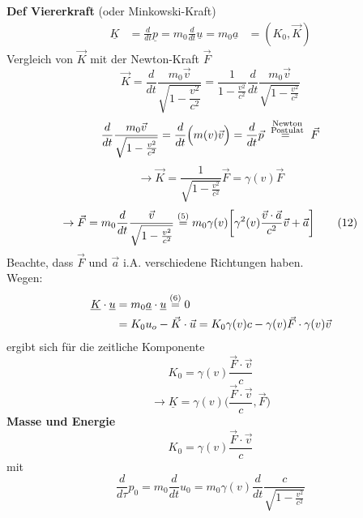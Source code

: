 \documentclass[titlepage,12pt,a4paper,ngerman]{report}
\newcommand{\tx}[1]{\textrm{#1}}
\begin{document}
\noindent
\textbf{Def Viererkraft} (oder Minkowski-Kraft)
\begin{align*}
\underline{K} &= \frac{d}{dt} \underline{p} = m_0 \frac{d}{dt} \underline{u} = m_0 \underline{a} \tag{10}
&= (K_0,\vec{K})
\end{align*}
Vergleich von $ \vec{K} $ mit der Newton-Kraft $ \vec{F} $
\begin{equation*}
\vec{K} = \frac{d}{dt} \frac{m_0 \vec{v}}{\sqrt{1-\dfrac{v^2}{c^2}}} = \frac{1}{1-\frac{v^2}{c^2}} \frac{d}{dt} \frac{m_0 \vec{v}}{\sqrt{1-\frac{v^2}{c^2}}}
\end{equation*}
\begin{equation*}
\frac{d}{dt} \frac{m_0 \vec{v}}{\sqrt{1 - \frac{v^2}{c^2}}} = \frac{d}{dt} \Big( m(v) \vec{v} \Big) = \frac{d}{dt} \vec{p} \buildrel\  \substack{\tx{Newton}\\\tx{Postulat}} \over = \ \vec{F}
\end{equation*}
\begin{equation*}
\rightarrow \vec{K} = \frac{1}{\sqrt{1 -  \frac{v^2}{c^2}}} \vec{F} = \gamma(v) \vec{F} \tag{11}
\end{equation*}
\begin{equation*}
\rightarrow \vec{F} = m_0 \frac{d}{dt} \frac{\vec{v}}{\sqrt{1 - \frac{v^2}{c^2}}} \buildrel (5) \over = m_0 \gamma (v) \bigg[ \gamma^2(v) \frac{\vec{v} \cdot \vec{a}}{c^2} \vec{v} + \vec{a} \bigg] \tag{12}
\end{equation*}
Beachte, dass $ \vec{F} $ und $ \vec{a} $ i.A. verschiedene Richtungen haben.\\
Wegen:
\begin{align*}
\underline{K} \cdot \underline{u} &= m_0 \underline{a} \cdot \underline{u} \buildrel (6) \over = 0 \\
&= K_0 u_o - \vec{K} \cdot \vec{u} = K_0 \gamma(v) c - \gamma(v) \vec{F} \cdot \gamma(v) \vec{v}
\end{align*}
ergibt sich für die zeitliche Komponente
$$K_0 = \gamma(v) \frac{\vec{F} \cdot \vec{v}}{c}$$
\begin{equation*}
\rightarrow \underline{K} = \gamma(v) \Bigg( \frac{\vec{F} \cdot \vec{v}}{c} , \vec{F} \Bigg) \tag{13}
\end{equation*}
\textbf{Masse und Energie}
$$K_0 = \gamma(v) \frac{\vec{F} \cdot \vec{v}}{c}$$
mit
\begin{equation*}
\frac{d}{d\tau} p_0 = m_0 \frac{d}{dt} u_0 = m_0 \gamma(v) \frac{d}{dt} \frac{c}{\sqrt{1 - \frac{v^2}{c^2}}}
\end{equation*}
\end{document}
